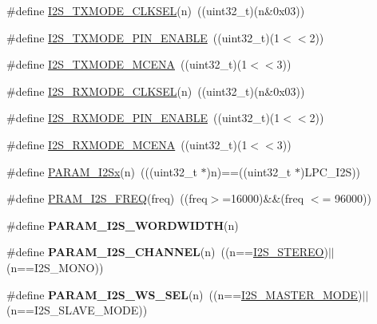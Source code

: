 \begin{DoxyCompactItemize}
\item 
\#define \hyperlink{group___i2_s___private___macros_ga34a82caff9de404af31e19e86ebaa193}{\-I2\-S\-\_\-\-T\-X\-M\-O\-D\-E\-\_\-\-C\-L\-K\-S\-E\-L}(n)~((uint32\-\_\-t)(n\&0x03))
\item 
\#define \hyperlink{group___i2_s___private___macros_ga3e268d07b159ec36998eb32a9e36af69}{\-I2\-S\-\_\-\-T\-X\-M\-O\-D\-E\-\_\-P\-I\-N\-\_\-\-E\-N\-A\-B\-L\-E}~((uint32\-\_\-t)(1$<$$<$2))
\item 
\#define \hyperlink{group___i2_s___private___macros_gabd67f37d51f2557f49fa600abb48225b}{\-I2\-S\-\_\-\-T\-X\-M\-O\-D\-E\-\_\-\-M\-C\-E\-N\-A}~((uint32\-\_\-t)(1$<$$<$3))
\item 
\#define \hyperlink{group___i2_s___private___macros_ga45351ee42b08814f1860c0d2a73379f0}{\-I2\-S\-\_\-\-R\-X\-M\-O\-D\-E\-\_\-\-C\-L\-K\-S\-E\-L}(n)~((uint32\-\_\-t)(n\&0x03))
\item 
\#define \hyperlink{group___i2_s___private___macros_ga2734ec0ee02ee7865c36b6ec3ffff081}{\-I2\-S\-\_\-\-R\-X\-M\-O\-D\-E\-\_\-P\-I\-N\-\_\-\-E\-N\-A\-B\-L\-E}~((uint32\-\_\-t)(1$<$$<$2))
\item 
\#define \hyperlink{group___i2_s___private___macros_ga64eb87a1f090271b07c7110f974f8300}{\-I2\-S\-\_\-\-R\-X\-M\-O\-D\-E\-\_\-\-M\-C\-E\-N\-A}~((uint32\-\_\-t)(1$<$$<$3))
\item 
\#define \hyperlink{group___i2_s___private___macros_ga0d075ebc9e3e3b8943ea9592618f7c61}{\-P\-A\-R\-A\-M\-\_\-\-I2\-Sx}(n)~(((uint32\-\_\-t $\ast$)n)==((uint32\-\_\-t $\ast$)\-L\-P\-C\-\_\-\-I2\-S))
\item 
\#define \hyperlink{group___i2_s___private___macros_gae611bb4fb87a75b8a6127ce4c71472ab}{\-P\-R\-A\-M\-\_\-\-I2\-S\-\_\-\-F\-R\-E\-Q}(freq)~((freq$>$=16000)\&\&(freq $<$= 96000))
\item 
\#define {\bfseries \-P\-A\-R\-A\-M\-\_\-\-I2\-S\-\_\-\-W\-O\-R\-D\-W\-I\-D\-T\-H}(n)
\item 
\hypertarget{group___i2_s___private___macros_ga65de9798b34ed85ad871eedf6234fd45}{\#define {\bfseries \-P\-A\-R\-A\-M\-\_\-\-I2\-S\-\_\-\-C\-H\-A\-N\-N\-E\-L}(n)~((n==\hyperlink{group___i2_s___public___macros_ga07e34ebc83183644aa54cc124b769a43}{\-I2\-S\-\_\-\-S\-T\-E\-R\-E\-O})$|$$|$(n==\-I2\-S\-\_\-\-M\-O\-N\-O))}\label{group___i2_s___private___macros_ga65de9798b34ed85ad871eedf6234fd45}

\item 
\hypertarget{group___i2_s___private___macros_gadce461c5114b3b40481c7746ea3a0971}{\#define {\bfseries \-P\-A\-R\-A\-M\-\_\-\-I2\-S\-\_\-\-W\-S\-\_\-\-S\-E\-L}(n)~((n==\hyperlink{group___i2_s___public___macros_ga67cd00ecbec35d0dd723909916fb1014}{\-I2\-S\-\_\-\-M\-A\-S\-T\-E\-R\-\_\-\-M\-O\-D\-E})$|$$|$(n==\-I2\-S\-\_\-\-S\-L\-A\-V\-E\-\_\-\-M\-O\-D\-E))}\label{group___i2_s___private___macros_gadce461c5114b3b40481c7746ea3a0971}


\end{DoxyCompactItemize}
